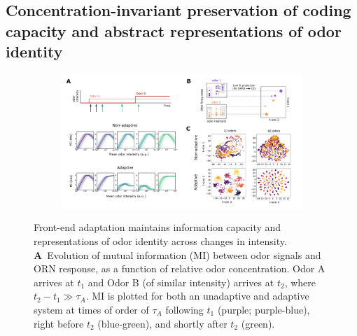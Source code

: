 \documentclass[9pt,twocolumn,twoside,lineno]{pnas-new}
\begin{document}

\subsection{Concentration-invariant preservation of coding capacity and abstract representations of odor identity}



\begin{figure}[!tb]
	\centering
	\begin{subfigure}[t]{\linewidth}
		\includegraphics[width=\textwidth]{figures/2_coding_representation}
		\label{fig:coding_a}
	\end{subfigure}
	\begin{subfigure}[t]{0\linewidth}
		\label{fig:coding_b}
	\end{subfigure}
	\caption{\footnotesize{Front-end adaptation maintains information capacity and representations of odor identity across changes in intensity. 
			\textbf{A}~Evolution of mutual information (MI) between odor signals and ORN response, as a function of relative odor concentration. Odor A arrives  at $t_1$ and Odor B (of similar intensity) arrives at $t_2$, where $t_2 - t_1 \gg \tau_A$. MI is plotted for both an unadaptive and adaptive system at times of order of $\tau_A$ following $t_1$ (purple; purple-blue), right before $t_2$ (blue-green), and shortly after $t_2$ (green). 
}}
\end{figure}
\end{document}
